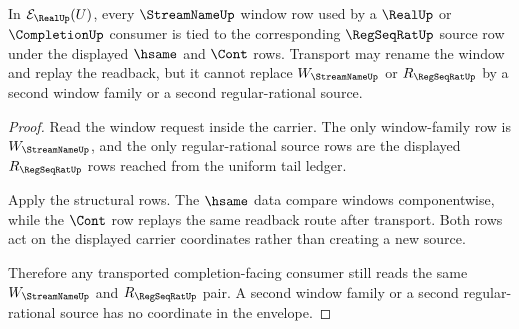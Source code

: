 \begin{theorem}
\label{thm:uniform-cauchy-criterion-real-completion-finite-envelope-tail-window-stability}
In $\mathcal{E}_{\RealUp}(U)$, every $\StreamNameUp$ window row used by a $\RealUp$ or $\CompletionUp$ consumer is tied to the corresponding $\RegSeqRatUp$ source row under the displayed $\hsame$ and $\Cont$ rows. Transport may rename the window and replay the readback, but it cannot replace $W_{\StreamNameUp}$ or $R_{\RegSeqRatUp}$ by a second window family or a second regular-rational source.
\end{theorem}
\begin{proof}
Read the window request inside the carrier. The only window-family row is $W_{\StreamNameUp}$, and the only regular-rational source rows are the displayed $R_{\RegSeqRatUp}$ rows reached from the uniform tail ledger.

Apply the structural rows. The $\hsame$ data compare windows componentwise, while the $\Cont$ row replays the same readback route after transport. Both rows act on the displayed carrier coordinates rather than creating a new source.

Therefore any transported completion-facing consumer still reads the same $W_{\StreamNameUp}$ and $R_{\RegSeqRatUp}$ pair. A second window family or a second regular-rational source has no coordinate in the envelope.
\end{proof}

